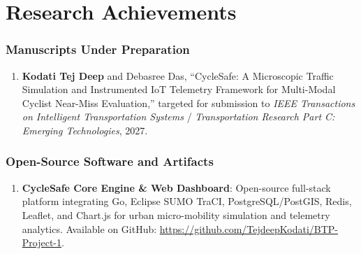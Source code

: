 \chapter*{Research Achievements}

\subsection*{Manuscripts Under Preparation}

\begin{enumerate}
	\item \textbf{Kodati Tej Deep} and Debasree Das, ``CycleSafe: A Microscopic Traffic Simulation and Instrumented IoT Telemetry Framework for Multi-Modal Cyclist Near-Miss Evaluation,'' targeted for submission to \textit{IEEE Transactions on Intelligent Transportation Systems} / \textit{Transportation Research Part C: Emerging Technologies}, 2027.
\end{enumerate}

\subsection*{Open-Source Software and Artifacts}

\begin{enumerate}
	\item \textbf{CycleSafe Core Engine \& Web Dashboard}: Open-source full-stack platform integrating Go, Eclipse SUMO TraCI, PostgreSQL/PostGIS, Redis, Leaflet, and Chart.js for urban micro-mobility simulation and telemetry analytics. Available on GitHub: \url{https://github.com/TejdeepKodati/BTP-Project-1}.
\end{enumerate}
